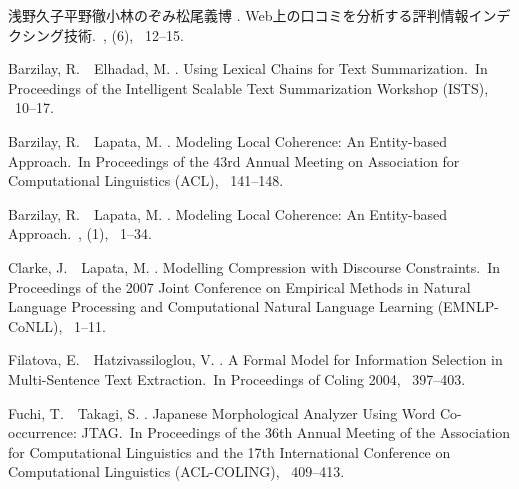\documentclass[japanese]{jnlp_1.4}
\begin{document}

\begin{thebibliography}{}

浅野久子\JBA 平野徹\JBA 小林のぞみ\JBA 松尾義博 \BBCP.
\newblock Web上の口コミを分析する評判情報インデクシング技術.\
\newblock {}, {}  (6), \mbox{\BPGS\ 12--15}.

Barzilay, R.\BBACOMMA\ \BBA\ Elhadad, M. \BBOP 1997\BBCP.
\newblock \BBOQ Using Lexical Chains for Text Summarization.\BBCQ\
\newblock In {\Bem Proceedings of the Intelligent Scalable Text Summarization
  Workshop (ISTS)}, \mbox{\BPGS\ 10--17}.

Barzilay, R.\BBACOMMA\ \BBA\ Lapata, M. \BBCP.
\newblock \BBOQ Modeling Local Coherence: An Entity-based Approach.\BBCQ\
\newblock In {\Bem Proceedings of the 43rd Annual Meeting on Association for
  Computational Linguistics (ACL)}, \mbox{\BPGS\ 141--148}.

Barzilay, R.\BBACOMMA\ \BBA\ Lapata, M. \BBOP 2008\BBCP.
\newblock \BBOQ Modeling Local Coherence: An Entity-based Approach.\BBCQ\
, {}  (1), \mbox{\BPGS\
  1--34}.

Clarke, J.\BBACOMMA\ \BBA\ Lapata, M. \BBOP 2007\BBCP.
\newblock \BBOQ Modelling Compression with Discourse Constraints.\BBCQ\
\newblock In {\Bem Proceedings of the 2007 Joint Conference on Empirical
  Methods in Natural Language Processing and Computational Natural Language
  Learning (EMNLP-CoNLL)}, \mbox{\BPGS\ 1--11}.

Filatova, E.\BBACOMMA\ \BBA\ Hatzivassiloglou, V. \BBCP.
\newblock \BBOQ A Formal Model for Information Selection in Multi-Sentence Text
  Extraction.\BBCQ\
\newblock In {\Bem Proceedings of Coling 2004}, \mbox{\BPGS\ 397--403}.

Fuchi, T.\BBACOMMA\ \BBA\ Takagi, S. \BBOP 1998\BBCP.
\newblock \BBOQ Japanese Morphological Analyzer Using Word Co-occurrence:
  JTAG.\BBCQ\
\newblock In {\Bem Proceedings of the 36th Annual Meeting of the Association
  for Computational Linguistics and the 17th International Conference on
  Computational Linguistics (ACL-COLING)}, \mbox{\BPGS\ 409--413}.


\end{thebibliography}
\end{document}
